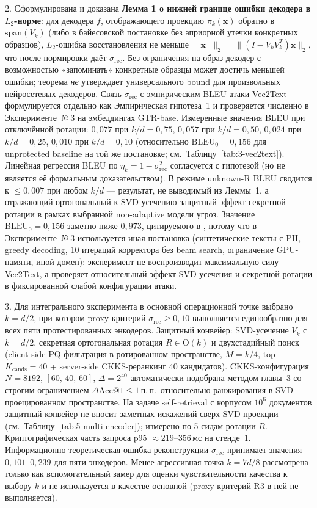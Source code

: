\documentclass[a4paper, 12pt, oneside, openany]{article}
\begin{document}
2. Сформулирована и доказана \textbf{Лемма 1 о нижней границе ошибки декодера в $L_2$-норме}: для декодера $f$, отображающего проекцию $\pi_k(\mathbf{x})$ обратно в $\mathrm{span}(V_k)$ (либо в байесовской постановке без априорной утечки конкретных образцов), $L_2$-ошибка восстановления не меньше $\|\mathbf{x}_{\perp}\|_{2} = \|(I - V_k V_k^{T}) \mathbf{x}\|_{2}$, что после нормировки даёт $\sigma_{\mathrm{rec}}$. Без ограничения на образ декодер с возможностью «запоминать» конкретные образцы может достичь меньшей ошибки; теорема \emph{не} утверждает универсального bound для произвольных нейросетевых декодеров. Связь $\sigma_{\mathrm{rec}}$ с эмпирическим BLEU атаки Vec2Text формулируется отдельно как Эмпирическая гипотеза~1 и проверяется численно в Эксперименте~№\,3 на эмбеддингах GTR-base. Измеренные значения BLEU при отключённой ротации: $0{,}077$ при $k/d = 0{,}75$, $0{,}057$ при $k/d = 0{,}50$, $0{,}024$ при $k/d = 0{,}25$, $0{,}010$ при $k/d = 0{,}10$ (относительно $\mathrm{BLEU}_{0} = 0{,}156$ для unprotected baseline на той же постановке; см.\ Таблицу~\ref{tab:3-vec2text}). Линейная регрессия BLEU по $\eta_k = 1 - \sigma_{\mathrm{rec}}^{2}$ согласуется с гипотезой (но не является её формальным доказательством). В режиме unknown-R BLEU сводится к $\leq 0{,}007$ при любом $k/d$ --- результат, не выводимый из Леммы~1, а отражающий ортогональный к SVD-усечению защитный эффект секретной ротации в рамках выбранной non-adaptive модели угроз. Значение $\mathrm{BLEU}_{0} = 0{,}156$ заметно ниже $0{,}973$, цитируемого в \cite{ref5}, потому что в Эксперименте~№\,3 используется иная постановка (синтетические тексты с PII, greedy decoding, 10 итераций корректора без beam search, ограничение GPU-памяти, иной домен): эксперимент не воспроизводит максимальную силу Vec2Text, а проверяет относительный эффект SVD-усечения и секретной ротации в фиксированной слабой конфигурации атаки.

3. Для интегрального эксперимента в основной операционной точке выбрано $k = d/2$, при котором proxy-критерий $\sigma_{\mathrm{rec}} \geq 0{,}10$ выполняется единообразно для всех пяти протестированных энкодеров. Защитный конвейер: SVD-усечение $V_k$ с $k = d/2$, секретная ортогональная ротация $R \in \mathrm{O}(k)$ и двухстадийный поиск (client-side PQ-фильтрация в ротированном пространстве, $M = k/4$, top-$K_{\mathrm{cands}} = 40$ + server-side CKKS-реранкинг 40 кандидатов). CKKS-конфигурация $N = 8192$, $[60,\,40,\,60]$, $\Delta = 2^{40}$ автоматически подобрана методом главы~3 со строгим ограничением $\Delta\mathrm{Acc@1} \leq 1$\,п.\,п.\ относительно ранжирования в SVD-проецированном пространстве. На задаче self-retrieval с корпусом $10^6$ документов защитный конвейер не вносит заметных искажений сверх SVD-проекции (см.\ Таблицу~\ref{tab:5-multi-encoder}); измерено по 5 сидам ротации $R$. Криптографическая часть запроса p95 $\approx 219$--$356$\,мс на стенде~1. Информационно-теоретическая ошибка реконструкции $\sigma_{\mathrm{rec}}$ принимает значения $0{,}101$--$0{,}239$ для пяти энкодеров. Менее агрессивная точка $k = 7d/8$ рассмотрена только как вспомогательный замер для оценки чувствительности качества к выбору $k$ и не используется в качестве основной (proxy-критерий R3 в ней не выполняется).
\end{document}
